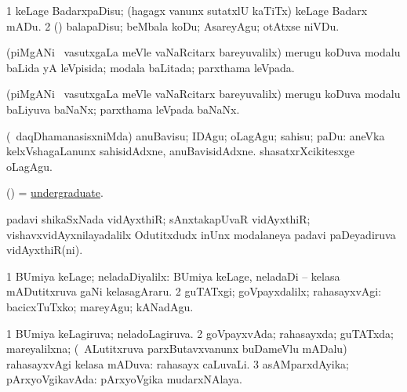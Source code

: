\bentry
{} 
\gl{\sakirx}
\expl{}
\bmng
\bnum
\num{1} keLage BadarxpaDisu; (hagagx \mo vanunx sutatxlU kaTiTx) keLage Badarx mADu. 
\num{2} (\rUpa) balapaDisu; beMbala koDu; AsareyAgu; otAtxse niVDu. 
\enum
\emng
\eentry

\bentry
{} 
\gl{\gu}
\expl{}
\bmng
 (piMgANi \mo\ vasutxgaLa meVle vaNaRcitarx bareyuvalilx) merugu koDuva modalu baLida yA leVpisida; modala baLitada; parxthama leVpada. 
\emng
\eentry

\bentry
{} 
\gl{\nA}
\expl{}
\bmng
 (piMgANi \mo\ vasutxgaLa meVle vaNaRcitarx bareyuvalilx) merugu koDuva modalu baLiyuva baNaNx; parxthama leVpada baNaNx. 
\emng
\eentry

\bentry
{} 
\gl{\sakirx}
\bmng
(\kanmu\ daqDhamanasisxniMda) anuBavisu; IDAgu; oLagAgu; sahisu; paDu:  aneVka kelxVshagaLanunx sahisidAdxne, anuBavisidAdxne.  shasatxrXcikitesxge oLagAgu. 
\emng
\eentry

\bentry
{} 
\gl{\nA}
\expl{}
\bmng
 (\AmA) = \hyperlink{undergraduate}{undergraduate}. 
\emng
\eentry

\bentry
{} 
\gl{\nA}
\expl{}
\bmng
 padavi shikaSxNada vidAyxthiR; sAnxtakapUvaR vidAyxthiR; vishavxvidAyxnilayadalilx Odutitxdudx inUnx modalaneya padavi paDeyadiruva vidAyxthiR(ni). 
\emng
\eentry

\bentry
{} 
\gl{\kirxvi}
\expl{}
\bmng
\bnum
\num{1} BUmiya keLage; neladaDiyalilx:  BUmiya keLage, neladaDi -- kelasa mADutitxruva gaNi kelasagAraru. 
\num{2} guTATxgi; goVpayxdalilx; rahasayxvAgi:  bacicxTuTxko; mareyAgu; kANadAgu. 
\enum
\emng
\eentry

\bentry
{} 
\gl{\gu}
\expl{}
\bmng
\bnum
\num{1} BUmiya keLagiruva; neladoLagiruva. 
\num{2} goVpayxvAda; rahasayxda; guTATxda; mareyalilxna; (\kanmu\ ALutitxruva parxButavxvanunx buDameVlu mADalu) rahasayxvAgi kelasa mADuva:  rahasayx caLuvaLi. 
\num{3} asAMparxdAyika; pArxyoVgikavAda:  pArxyoVgika mudarxNAlaya. 
\enum
\emng

